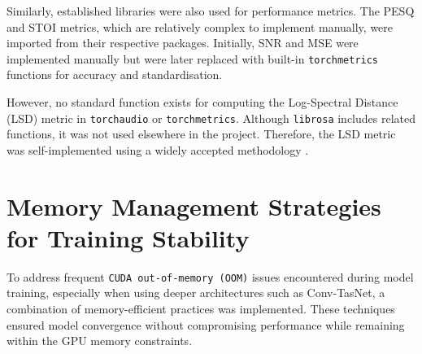 Similarly, established libraries were also used for performance metrics. The PESQ and STOI metrics, which are relatively complex to implement manually, were imported from their respective packages. Initially, SNR and MSE were implemented manually but were later replaced with built-in \texttt{torchmetrics} functions for accuracy and standardisation.

However, no standard function exists for computing the Log-Spectral Distance (LSD) metric in \texttt{torchaudio} or \texttt{torchmetrics}. Although \texttt{librosa} includes related functions, it was not used elsewhere in the project. Therefore, the LSD metric was self-implemented using a widely accepted methodology \cite{enwiki_lsd}.


\section{Memory Management Strategies for Training Stability}

To address frequent \texttt{CUDA out-of-memory (OOM)} issues encountered during model training, especially when using deeper architectures such as Conv-TasNet, a combination of memory-efficient practices was implemented. These techniques ensured model convergence without compromising performance while remaining within the GPU memory constraints.

